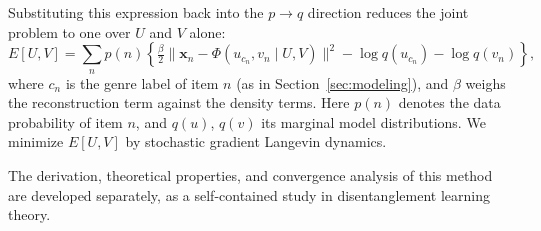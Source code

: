 Substituting this expression back into the $p \to q$ direction reduces
the joint problem to one over $U$ and $V$ alone:
\begin{equation}\label{eq:E-UV}
    E[U, V] = \sum_n p(n) \left\{
    \tfrac{\beta}{2}
    \bigl\|\mathbf{x}_n - \Phi(u_{c_n}, v_n \mid U, V)\bigr\|^2
    - \log q(u_{c_n}) - \log q(v_n)
    \right\},
\end{equation}
where $c_n$ is the genre label of item $n$ (as in
Section~\ref{sec:modeling}), and $\beta$ weighs the reconstruction term
against the density terms. Here $p(n)$ denotes the data probability of item $n$, and $q(u)$, $q(v)$ its marginal model distributions. We minimize $E[U, V]$ by stochastic gradient
Langevin dynamics.

The derivation, theoretical properties, and convergence analysis of this method
are developed separately, as a self-contained study in disentanglement learning
theory.




